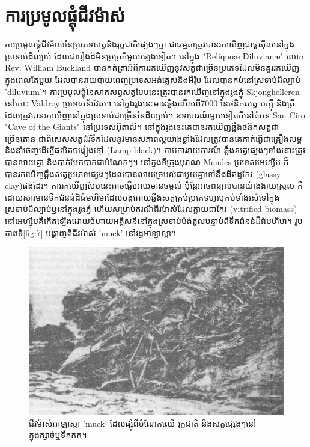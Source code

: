 \documentclass[10pt,twocolumn,letterpaper]{article}
\begin{document}
\section{ការប្រមូលផ្ដុំជីវម៉ាស់}

ការប្រមូលផ្តុំជីវម៉ាស់នៃប្រភេទសត្វនិងរុក្ខជាតិផ្សេងៗគ្នា ជាធម្មតាត្រូវបានរកឃើញជាផូសុីលនៅក្នុងស្រទាប់ដីល្បាប់ ដែលជារឿងដ៏មិនប្រក្រតីមួយផ្សេងទៀត។ នៅក្នុង "Reliquoæ Diluvianæ" លោក Rev. William Buckland បានកត់ត្រាអំពីការរកឃើញនូវសត្វជាច្រើនប្រភេទដែលមិនគួររកឃើញក្នុងពេលតែមួយ ដែលបានរាយប៉ាយពេញប្រទេសអង់គ្លេសនិងអឺរ៉ុប ដែលបានកប់នៅស្រទាប់ដីល្បាប់ 'diluvium'\cite{58}។ ការប្រមូលផ្តុំនៃសាកសព្វសត្វបែបនេះត្រូវបានរកឃើញនៅក្នុងរូងភ្នុំ Skjonghelleren នៅកោះ Valdroy ប្រទេសន័រវែស។ នៅក្នុងរូងនេះមានឆ្អឹងលើសពី7000 នៃថនិកសត្វ បក្សុី និងត្រី ដែលត្រូវបានរកឃើញនៅក្នុងស្រទាប់ជាច្រើននៃដីល្បាប់\cite{59}។ ឧទាហរណ៍មួយទៀតគឺនៅតំបន់ San Ciro "Cave of the Giants" នៅប្រទេសអុីតាលី។ នៅក្នុងរូងនេះគេបានរកឃើញឆ្អឹងថនិកសត្វជាច្រើនតោន ជាពិសេសសត្វដំរីទឹកដែលនូវមានសភាពល្អយ៉ាងខ្លាំងដែលត្រូវបានគេកាត់ធ្វើជាគ្រឿងលម្អ និងនាំចេញដើម្បីផលិតចង្កៀងខ្មៅ (Lamp black)។ តាមការរាយការណ៍ ឆ្អឹងសត្វផ្សេងៗទាំងនោះត្រូវបានលាយគ្នា និងបាក់បែកបាក់ជាបំណែកៗ\cite{60,61}។ នៅក្នុងទីក្រុងបុរាណ Mendes ប្រទេសអេហ្ស៊ីប ក៏បានរកឃើញឆ្អឹងសត្វប្រភេទផ្សេងៗដែលបានលាយច្របល់ជាមួយគ្នាទៅនឹងដីឥដ្ឋកែវ (glassy clay)ផងដែរ\cite{57}។ ការរកឃើញបែបនេះអាចធ្វើអោយមានចម្ងល់ ប៉ុន្តែអាចពន្យល់បានយ៉ាងងាយស្រួល គឺដោយសារមានទឹកជំនន់ដ៏ធំមហិមាដែលបង្កអោយឆ្នឹងសត្វគ្រប់ប្រភេទហូរឬកប់ទាំងរស់ទៅក្នុងស្រទាប់ដីល្បាប់ឬនៅក្នុងរូងភ្នំ ហើយសម្រាប់ករណីជីវម៉ាស់ដែលក្លាយជាកែវ (vitrified biomass) នៅអេហ្ស៊ីបគឺកើតឡើងដោយចំហាយអគ្គិសនីនៅក្នុងស្រទាប់ម៉ង់តូលបន្ទាប់ពីទឹកជំនន់ដ៏ធំមហិមា។ រូបភាពទី\ref{fig:7} បង្ហាញពីជីវម៉ាស់ 'muck' នៅរដ្ឋអាឡាស្កា\cite{56}។

\begin{figure}[t]
\begin{center}
   \includegraphics[width=1\linewidth]{muck-crop.jpeg}
\end{center}
   \caption{ជីវម៉ាស់អាឡាស្កា 'muck' ដែលផ្សុំពីបំណែកឈើ រុក្ខជាតិ និងសត្វផ្សេងៗនៅក្នុងក្សាច់ឬទឹកកក\cite{146}។}
\label{fig:7}
\label{fig:onecol}
\end{figure}
\end{document}
